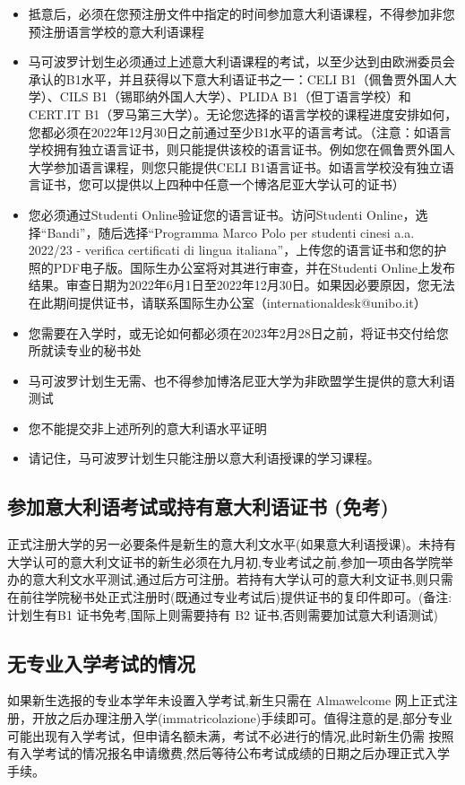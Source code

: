 \begin{itemize}
\item 抵意后，必须在您预注册文件中指定的时间参加意大利语课程，不得参加非您预注册语言学校的意大利语课程 
\item 马可波罗计划生必须通过上述意大利语课程的考试，以至少达到由欧洲委员会承认的B1水平，并且获得以下意大利语证书之一：CELI B1（佩鲁贾外国人大学）、CILS B1（锡耶纳外国人大学）、PLIDA B1（但丁语言学校）和CERT.IT B1（罗马第三大学）。无论您选择的语言学校的课程进度安排如何，您都必须在2022年12月30日之前通过至少B1水平的语言考试。（注意：如语言学校拥有独立语言证书，则只能提供该校的语言证书。例如您在佩鲁贾外国人大学参加语言课程，则您只能提供CELI B1语言证书。如语言学校没有独立语言证书，您可以提供以上四种中任意一个博洛尼亚大学认可的证书）
\item 您必须通过Studenti Online验证您的语言证书。访问Studenti Online，选择“Bandi”，随后选择“Programma Marco Polo per studenti cinesi a.a. 2022/23 - verifica certificati di lingua italiana”，上传您的语言证书和您的护照的PDF电子版。国际生办公室将对其进行审查，并在Studenti Online上发布结果。审查日期为2022年6月1日至2022年12月30日。如果因必要原因，您无法在此期间提供证书，请联系国际生办公室（internationaldesk@unibo.it）
\item 您需要在入学时，或无论如何都必须在2023年2月28日之前，将证书交付给您所就读专业的秘书处
\item 马可波罗计划生无需、也不得参加博洛尼亚大学为非欧盟学生提供的意大利语测试
\item 您不能提交非上述所列的意大利语水平证明
\item 请记住，马可波罗计划生只能注册以意大利语授课的学习课程。
\end{itemize}
\subsection{参加意大利语考试或持有意大利语证书 (免考)}
正式注册大学的另一必要条件是新生的意大利文水平(如果意大利语授课)。未持有大学认可的意大利文证书的新生必须在九月初,专业考试之前,参加一项由各学院举办的意大利文水平测试,通过后方可注册。若持有大学认可的意大利文证书,则只需在前往学院秘书处正式注册时(既通过专业考试后)提供证书的复印件即可。(备注:计划生有B1 证书免考,国际上则需要持有 B2 证书,否则需要加试意大利语测试) 




\subsection{无专业入学考试的情况}
如果新生选报的专业本学年未设置入学考试,新生只需在 Almawelcome 网上正式注册，开放之后办理注册入学(immatricolazione)手续即可。值得注意的是,部分专业可能出现有入学考试，但申请名额未满，考试不必进行的情况,此时新生仍需 按照有入学考试的情况报名申请缴费,然后等待公布考试成绩的日期之后办理正式入学手续。 
